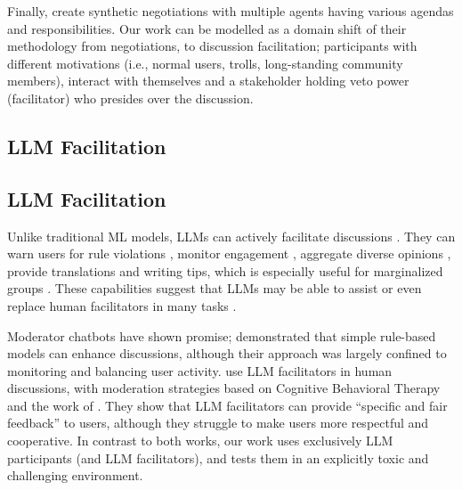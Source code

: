 Finally, \citet{abdelnabi_negotiations} create synthetic negotiations with multiple agents having various agendas and responsibilities. Our work can be modelled as a domain shift of their methodology from negotiations, to discussion facilitation; participants with different motivations (i.e., normal users, trolls, long-standing community members), interact with themselves and a stakeholder holding veto power (facilitator) who presides over the discussion.


\subsection{LLM Facilitation}
\subsection{LLM Facilitation}

Unlike traditional \ac{ML} models, \acp{LLM} can actively facilitate discussions \cite{korre2025evaluation}. They can warn users for rule violations \cite{Kumar_AbuHashem_Durumeric_2024}, monitor engagement \cite{schroeder-etal-2024-fora}, aggregate diverse opinions \cite{small-polis-llm}, provide translations and writing tips, which is especially useful for marginalized groups \cite{Tsai2024Generative}. These capabilities suggest that \acp{LLM} may be able to assist or even replace human facilitators in many tasks \cite{seering_self_moderation}.

Moderator chatbots have shown promise; \citet{kim_et_al_chatbot} demonstrated that simple rule-based models can enhance discussions, although their approach was largely confined to monitoring and balancing user activity. \citet{cho-etal-2024-language} use \ac{LLM} facilitators in human discussions, with moderation strategies based on Cognitive Behavioral Therapy and the work of \citet{rosenberg2015nonviolent}. They show that \ac{LLM} facilitators can provide “specific and fair feedback” to users, although they struggle to make users more respectful and cooperative.  In contrast to both works, our work uses exclusively \ac{LLM} participants (and \ac{LLM} facilitators), and tests them in an explicitly toxic and challenging environment. %
